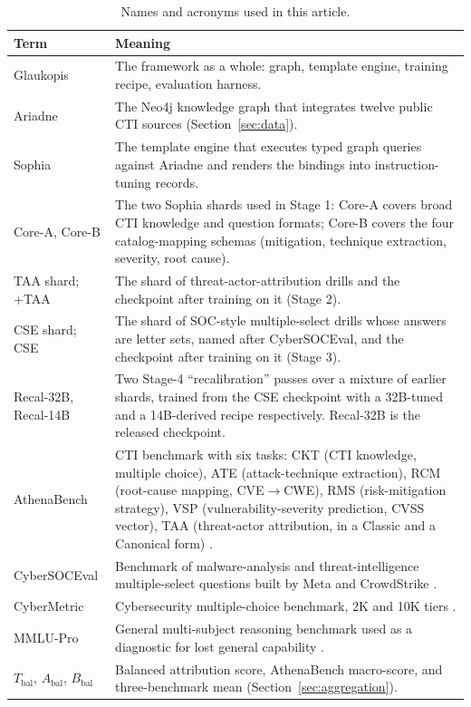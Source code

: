 \documentclass[preprint,12pt,authoryear]{elsarticle}
\newcommand{\Abal}{A_{\mathrm{bal}}}
\newcommand{\Bbal}{B_{\mathrm{bal}}}
\newcommand{\Tbal}{T_{\mathrm{bal}}}
\begin{document}
\begin{table}[!htbp]
\centering\footnotesize
\caption{Names and acronyms used in this article.}\label{tab:glossary}
\begin{tabularx}{\textwidth}{@{}p{3.2cm}X@{}}
\toprule Term & Meaning \\\midrule
Glaukopis & The framework as a whole: graph, template engine, training recipe, evaluation harness. \\
Ariadne & The Neo4j knowledge graph that integrates twelve public CTI sources (Section~\ref{sec:data}). \\
Sophia & The template engine that executes typed graph queries against Ariadne and renders the bindings into instruction-tuning records. \\
Core-A, Core-B & The two Sophia shards used in Stage 1: Core-A covers broad CTI knowledge and question formats; Core-B covers the four catalog-mapping schemas (mitigation, technique extraction, severity, root cause). \\
TAA shard; +TAA & The shard of threat-actor-attribution drills and the checkpoint after training on it (Stage 2). \\
CSE shard; CSE & The shard of SOC-style multiple-select drills whose answers are letter sets, named after CyberSOCEval, and the checkpoint after training on it (Stage 3). \\
Recal-32B, Recal-14B & Two Stage-4 ``recalibration'' passes over a mixture of earlier shards, trained from the CSE checkpoint with a 32B-tuned and a 14B-derived recipe respectively. Recal-32B is the released checkpoint. \\
AthenaBench & CTI benchmark with six tasks: CKT (CTI knowledge, multiple choice), ATE (attack-technique extraction), RCM (root-cause mapping, CVE$\to$CWE), RMS (risk-mitigation strategy), VSP (vulnerability-severity prediction, CVSS vector), TAA (threat-actor attribution, in a Classic and a Canonical form) \citep{alam2025athenabench}. \\
CyberSOCEval & Benchmark of malware-analysis and threat-intelligence multiple-select questions built by Meta and CrowdStrike \citep{deason2025cybersoceval}. \\
CyberMetric & Cybersecurity multiple-choice benchmark, 2K and 10K tiers \citep{tihanyi2024cybermetric}. \\
MMLU-Pro & General multi-subject reasoning benchmark used as a diagnostic for lost general capability \citep{wang2024mmlupro}. \\
$\Tbal$, $\Abal$, $\Bbal$ & Balanced attribution score, AthenaBench macro-score, and three-benchmark mean (Section~\ref{sec:aggregation}). \\
\bottomrule
\end{tabularx}
\end{table}
\end{document}
